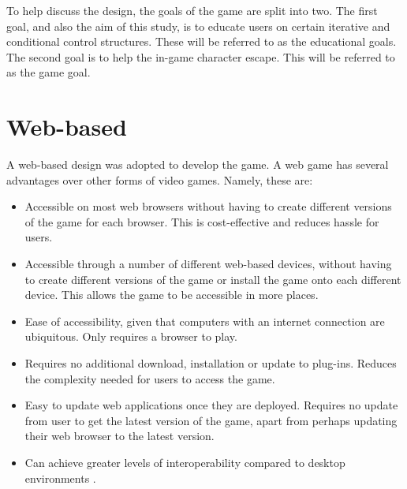 \documentclass[a4paper,11.5pt]{report}
\numberwithin{figure}{section}
\numberwithin{table}{section}
\numberwithin{equation}{section}
\numberwithin{equation}{section}
\begin{document}
To help discuss the design, the goals of the game are split into two. The first goal, and also the aim of this study, is to educate users on certain iterative and conditional control structures. These will be referred to as the educational goals. The second goal is to help the in-game character escape. This will be referred to as the game goal.

\section{Web-based}


A web-based design was adopted to develop the game. A web game has several advantages over other forms of video games. Namely, these are:


\begin{itemize}

	\item Accessible on most web browsers without having to create different versions of the game for each browser. This is cost-effective and reduces hassle for users.
	\item Accessible through a number of different web-based devices, without having to create different versions of the game or install the game onto each different device. This allows the game to be accessible in more places. 
	\item Ease of accessibility, given that computers with an internet connection are ubiquitous. Only requires a browser to play.
	\item Requires no additional download, installation or update to plug-ins. Reduces the complexity needed for users to access the game.
	\item Easy to update web applications once they are deployed. Requires no update from user to get the latest version of the game, apart from perhaps updating their web browser to the latest version.
	\item Can achieve greater levels of interoperability compared to desktop environments \citep{roungas2015}.
	
\end{itemize}
\end{document}
